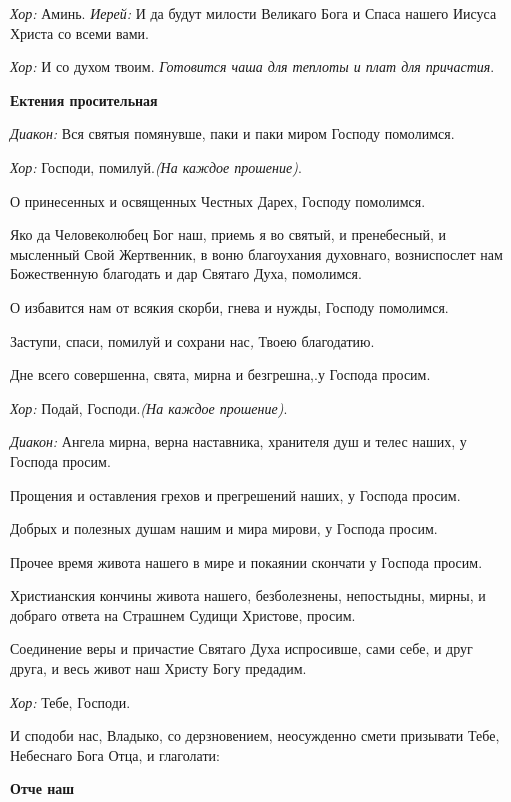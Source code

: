 {\itshape     Хор:} Аминь. {\itshape  Иерей:} И да будут милости Великаго Бога и Спаса нашего Иисуса Христа со всеми вами. 

{\itshape    Хор:} И со духом твоим. {\itshape  Готовится чаша для теплоты и плат для причастия}.  

\medskip 

 {\bfseries  Ектения просительная } 

 {\itshape  Диакон:} Вся святыя помянувше, паки и паки миром Господу помолимся. 

 {\itshape Хор:} Господи, помилуй.{\itshape  (На каждое прошение)}. 

   О принесенных и освященных Честных Дарех, Господу помолимся. 

   Яко да Человеколюбец Бог наш, приемь я во святый, и пренебесный, и мысленный Свой Жертвенник, в воню благоухания духовнаго, возниспослет нам Божественную благодать и дар Святаго Духа, помолимся. 

   О избавится нам от всякия скорби, гнева и нужды, Господу помолимся. 

   Заступи, спаси, помилуй и сохрани нас{\itshape ,} Твоею благодатию. 

   Дне всего совершенна, свята, мирна и безгрешна,.у Господа просим. 

{\itshape    Хор:} Подай, Господи.{\itshape  (На каждое прошение)}. 

{\itshape    Диакон:} Ангела мирна, верна наставника, хранителя душ и телес наших, у Господа просим. 

   Прощения и оставления грехов и прегрешений наших, у Господа просим. 

   Добрых и полезных душам нашим и мира мирови, у Господа просим. 

   Прочее время живота нашего в мире и покаянии скончати у Господа просим. 

   Христианския кончины живота нашего, безболезнены, непостыдны, мирны, и добраго ответа на Страшнем Судищи Христове, просим. 

   Соединение веры и причастие Святаго Духа испросивше, сами себе, и друг друга, и весь живот наш Христу Богу предадим. 

{\itshape    Хор:} Тебе, Господи. 

   И сподоби нас, Владыко, со дерзновением, неосужденно смети призывати Тебе, Небеснаго Бога Отца, и глаголати:  

\medskip 

 {\bfseries  Отче наш }

